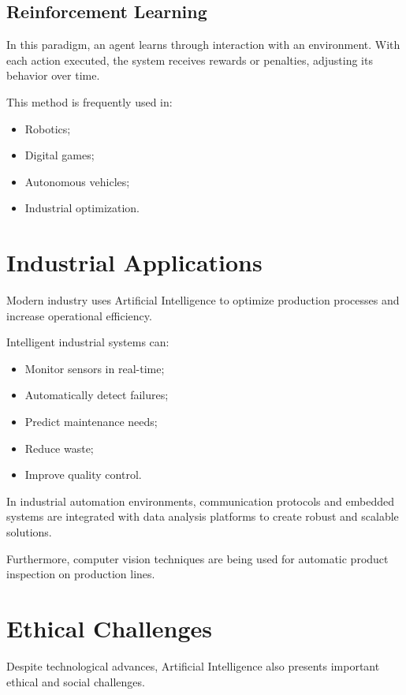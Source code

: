 \documentclass[11pt]{article}
\begin{document}
\subsection{Reinforcement Learning}

In this paradigm, an agent learns through interaction with an environment. With each action
executed, the system receives rewards or penalties, adjusting its behavior over
time.

This method is frequently used in:

\begin{itemize}
    \item Robotics;
    \item Digital games;
    \item Autonomous vehicles;
    \item Industrial optimization.
\end{itemize} 

\section{Industrial Applications}

Modern industry uses Artificial Intelligence to optimize production processes and increase
operational efficiency.

Intelligent industrial systems can:

\begin{itemize}
    \item Monitor sensors in real-time;
    \item Automatically detect failures;
    \item Predict maintenance needs;
    \item Reduce waste;
    \item Improve quality control.
\end{itemize}

In industrial automation environments, communication protocols and embedded systems are
integrated with data analysis platforms to create robust and scalable solutions.
 
Furthermore, computer vision techniques are being used for automatic product inspection
on production lines.

\section{Ethical Challenges}

Despite technological advances, Artificial Intelligence also presents important ethical and
social challenges.
\end{document}
